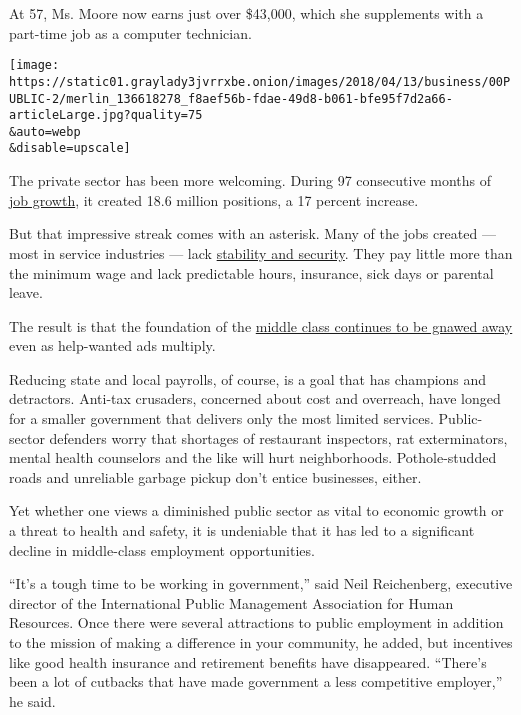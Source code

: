 At 57, Ms. Moore now earns just over \$43,000, which she supplements
with a part-time job as a computer technician.

\texttt{[image: https://static01.graylady3jvrrxbe.onion/images/2018/04/13/business/00PUBLIC-2/merlin\_136618278\_f8aef56b-fdae-49d8-b061-bfe95f7d2a66-articleLarge.jpg?quality=75\\\&auto=webp\\\&disable=upscale]}

The private sector has been more welcoming. During 97 consecutive months
of \href{https://www.bls.gov/news.release/empsit.nr0.htm}{job growth},
it created 18.6 million positions, a 17 percent increase.

But that impressive streak comes with an asterisk. Many of the jobs
created --- most in service industries --- lack
\href{https://www.nytimes3xbfgragh.onion/2017/05/31/business/economy/volatile-income-economy-jobs.html}{stability
and security}. They pay little more than the minimum wage and lack
predictable hours, insurance, sick days or parental leave.

The result is that the foundation of the
\href{https://www.nytimes3xbfgragh.onion/2017/09/16/business/economy/bump-in-us-incomes-doesnt-erase-50-years-of-pain.html}{middle
class continues to be gnawed away} even as help-wanted ads multiply.

Reducing state and local payrolls, of course, is a goal that has
champions and detractors. Anti-tax crusaders, concerned about cost and
overreach, have longed for a smaller government that delivers only the
most limited services. Public-sector defenders worry that shortages of
restaurant inspectors, rat exterminators, mental health counselors and
the like will hurt neighborhoods. Pothole-studded roads and unreliable
garbage pickup don't entice businesses, either.

Yet whether one views a diminished public sector as vital to economic
growth or a threat to health and safety, it is undeniable that it has
led to a significant decline in middle-class employment opportunities.

``It's a tough time to be working in government,'' said Neil
Reichenberg, executive director of the International Public Management
Association for Human Resources. Once there were several attractions to
public employment in addition to the mission of making a difference in
your community, he added, but incentives like good health insurance and
retirement benefits have disappeared. ``There's been a lot of cutbacks
that have made government a less competitive employer,'' he said.

